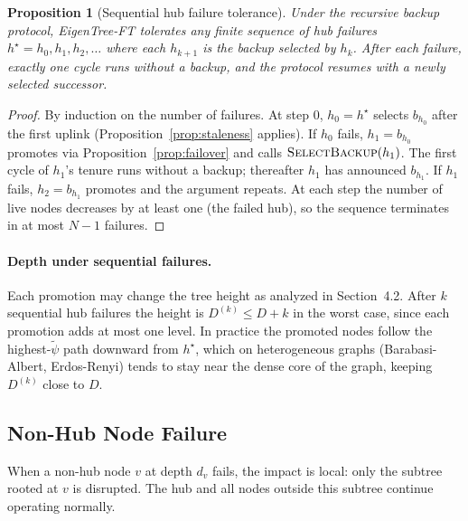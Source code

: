 \documentclass{article}
\newtheorem{proposition}{Proposition}
\newcommand{\merwft}{EigenTree-FT}
\begin{document}
\begin{proposition}[Sequential hub failure tolerance]
\label{prop:recursive}
    Under the recursive backup protocol, \merwft{} tolerates any finite sequence of
    hub failures $h^\star = h_0, h_1, h_2, \ldots$ where each $h_{k+1}$ is the backup
    selected by $h_k$. After each failure, exactly one cycle runs without a backup, and
    the protocol resumes with a newly selected successor.
\end{proposition}

\begin{proof}
    By induction on the number of failures. At step 0, $h_0 = h^\star$ selects $b_{h_0}$
    after the first uplink (Proposition~\ref{prop:staleness} applies). If $h_0$ fails,
    $h_1 = b_{h_0}$ promotes via Proposition~\ref{prop:failover} and calls
    $\textsc{SelectBackup}(h_1)$. The first cycle of $h_1$'s tenure runs without a
    backup; thereafter $h_1$ has announced $b_{h_1}$. If $h_1$ fails, $h_2 = b_{h_1}$
    promotes and the argument repeats. At each step the number of live nodes decreases by
    at least one (the failed hub), so the sequence terminates in at most $N-1$ failures.
\end{proof}

\paragraph{Depth under sequential failures.} Each promotion may change the tree height
as analyzed in Section~4.2. After $k$ sequential hub failures the height is
$D^{(k)} \leq D + k$ in the worst case, since each promotion adds at most one level.
In practice the promoted nodes follow the highest-$\tilde\psi$ path downward from
$h^\star$, which on heterogeneous graphs (Barabasi-Albert, Erdos-Renyi) tends to stay
near the dense core of the graph, keeping $D^{(k)}$ close to $D$.

\subsection{Non-Hub Node Failure}

When a non-hub node $v$ at depth $d_v$ fails, the impact is local: only the subtree
rooted at $v$ is disrupted. The hub and all nodes outside this subtree continue operating
normally.
\end{document}

